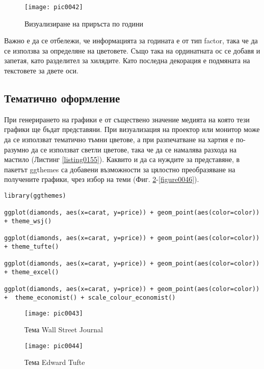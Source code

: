 \begin{figure}[h!]
  \centering
  \texttt{[image: pic0042]}
  \caption{Визуализиране на приръста по години}
\label{figure0042}
\end{figure}
\FloatBarrier

Важно е да се отбележи, че информацията за годината е от тип factor, така че да се използва за определяне на цветовете. Също така на ординатната ос се добавя и запетая, като разделител за хилядите. Като последна декорация е подмяната на текстовете за двете оси. 

\subsection{Тематично оформление}

При генерирането на графики е от съществено значение медията на която тези графики ще бъдат представяни. При визуализация на проектор или монитор може да се използват тематично тъмни цветове, а при разпечатване на хартия е по-разумно да се използват светли цветове, така че да се намалява разхода на мастило (Листинг \ref{listing0155}). Каквито и да са нуждите за представяне, в пакетът ggthemes са добавени възможности за цялостно преобразяване на получените графики, чрез избор на теми (Фиг. \ref{figure0043}-\ref{figure0046}).

\begin{lstlisting}[caption=Избор на теми за визуално представяне, label=listing0155]
library(ggthemes)

ggplot(diamonds, aes(x=carat, y=price)) + geom_point(aes(color=color)) + theme_wsj()

ggplot(diamonds, aes(x=carat, y=price)) + geom_point(aes(color=color)) + theme_tufte()

ggplot(diamonds, aes(x=carat, y=price)) + geom_point(aes(color=color)) + theme_excel()

ggplot(diamonds, aes(x=carat, y=price)) + geom_point(aes(color=color)) +  theme_economist() + scale_colour_economist()
\end{lstlisting}

\begin{figure}[h!]
  \centering
  \texttt{[image: pic0043]}
  \caption{Тема Wall Street Journal}
\label{figure0043}
\end{figure}
\FloatBarrier

\begin{figure}[h!]
  \centering
  \texttt{[image: pic0044]}
  \caption{Тема Edward Tufte}
\label{figure0044}
\end{figure}
\FloatBarrier

